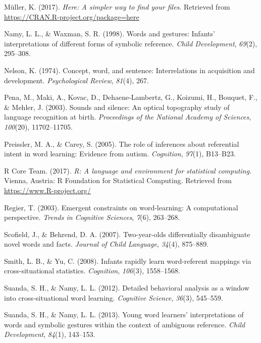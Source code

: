 \documentclass[english,floatsintext,man]{apa6}
\theoremstyle{definition}
\theoremstyle{definition}
\theoremstyle{definition}
\theoremstyle{remark}
\begin{document}
\leavevmode\hypertarget{ref-R-here}{}%
Müller, K. (2017). \emph{Here: A simpler way to find your files}.
Retrieved from \url{https://CRAN.R-project.org/package=here}

\leavevmode\hypertarget{ref-namy1998words}{}%
Namy, L. L., \& Waxman, S. R. (1998). Words and gestures: Infants'
interpretations of different forms of symbolic reference. \emph{Child
Development}, \emph{69}(2), 295--308.

\leavevmode\hypertarget{ref-nelson1974concept}{}%
Nelson, K. (1974). Concept, word, and sentence: Interrelations in
acquisition and development. \emph{Psychological Review}, \emph{81}(4),
267.

\leavevmode\hypertarget{ref-pena2003sounds}{}%
Pena, M., Maki, A., Kovac, D., Dehaene-Lambertz, G., Koizumi, H.,
Bouquet, F., \& Mehler, J. (2003). Sounds and silence: An optical
topography study of language recognition at birth. \emph{Proceedings of
the National Academy of Sciences}, \emph{100}(20), 11702--11705.

\leavevmode\hypertarget{ref-preissler2005role}{}%
Preissler, M. A., \& Carey, S. (2005). The role of inferences about
referential intent in word learning: Evidence from autism.
\emph{Cognition}, \emph{97}(1), B13--B23.

\leavevmode\hypertarget{ref-R-base}{}%
R Core Team. (2017). \emph{R: A language and environment for statistical
computing}. Vienna, Austria: R Foundation for Statistical Computing.
Retrieved from \url{https://www.R-project.org/}

\leavevmode\hypertarget{ref-regier2003emergent}{}%
Regier, T. (2003). Emergent constraints on word-learning: A
computational perspective. \emph{Trends in Cognitive Sciences},
\emph{7}(6), 263--268.

\leavevmode\hypertarget{ref-scofield2007two}{}%
Scofield, J., \& Behrend, D. A. (2007). Two-year-olds differentially
disambiguate novel words and facts. \emph{Journal of Child Language},
\emph{34}(4), 875--889.

\leavevmode\hypertarget{ref-smith2008infants}{}%
Smith, L. B., \& Yu, C. (2008). Infants rapidly learn word-referent
mappings via cross-situational statistics. \emph{Cognition},
\emph{106}(3), 1558--1568.

\leavevmode\hypertarget{ref-suanda2012detailed}{}%
Suanda, S. H., \& Namy, L. L. (2012). Detailed behavioral analysis as a
window into cross-situational word learning. \emph{Cognitive Science},
\emph{36}(3), 545--559.

\leavevmode\hypertarget{ref-suanda2013young}{}%
Suanda, S. H., \& Namy, L. L. (2013). Young word learners'
interpretations of words and symbolic gestures within the context of
ambiguous reference. \emph{Child Development}, \emph{84}(1), 143--153.
\end{document}
